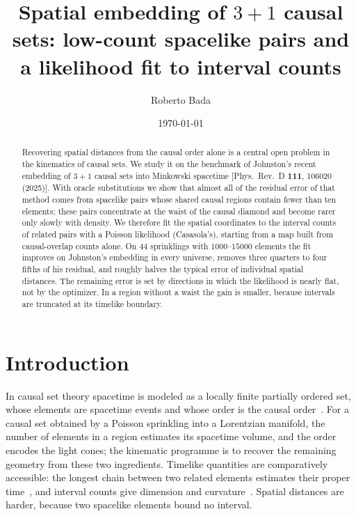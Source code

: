 \documentclass[prd,twocolumn,superscriptaddress,nofootinbib,amsmath,amssymb,floatfix]{revtex4-2}
\begin{document}
\title{Spatial embedding of $3+1$ causal sets: low-count spacelike pairs and a likelihood fit to interval counts}

\author{Roberto Bada}

\date{\today}

\begin{abstract}
Recovering spatial distances from the causal order alone is a central open problem in the kinematics of causal sets. We study it on the benchmark of Johnston's recent embedding of $3+1$ causal sets into Minkowski spacetime [Phys.\ Rev.\ D \textbf{111}, 106020 (2025)]. With oracle substitutions we show that almost all of the residual error of that method comes from spacelike pairs whose shared causal regions contain fewer than ten elements; these pairs concentrate at the waist of the causal diamond and become rarer only slowly with density. We therefore fit the spatial coordinates to the interval counts of related pairs with a Poisson likelihood (Casasola's), starting from a map built from causal-overlap counts alone. On $44$ sprinklings with $1000$--$15000$ elements the fit improves on Johnston's embedding in every universe, removes three quarters to four fifths of his residual, and roughly halves the typical error of individual spatial distances. The remaining error is set by directions in which the likelihood is nearly flat, not by the optimizer. In a region without a waist the gain is smaller, because intervals are truncated at its timelike boundary.
\end{abstract}

\maketitle

\section{Introduction}\label{sec:intro}
In causal set theory spacetime is modeled as a locally finite partially ordered set, whose elements are spacetime events and whose order is the causal order~\cite{BLMS87,Surya19}. For a causal set obtained by a Poisson sprinkling into a Lorentzian manifold, the number of elements in a region estimates its spacetime volume, and the order encodes the light cones; the kinematic programme is to recover the remaining geometry from these two ingredients. Timelike quantities are comparatively accessible: the longest chain between two related elements estimates their proper time~\cite{BrightwellGregory91}, and interval counts give dimension and curvature~\cite{GlaserSurya13,RSS13,BD10}. Spatial distances are harder, because two spacelike elements bound no interval.
\end{document}
